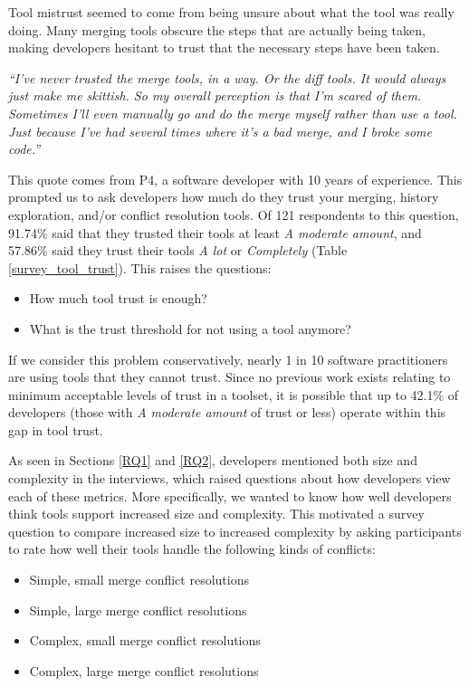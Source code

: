 Tool mistrust seemed to come from being unsure about what the tool was really doing. Many merging tools obscure the steps that are actually being taken, making developers hesitant to trust that the necessary steps have been taken. 
\begin{displayquote}
\textit{``I've never trusted the merge tools, in a way. Or the diff tools. It would always just make me skittish. So my overall perception is that I'm scared of them. Sometimes I'll even manually go and do the merge myself rather than use a tool. Just because I've had several times where it's a bad merge, and I broke some code.''}
\end{displayquote}
This quote comes from P4, a software developer with 10 years of experience.
This prompted us to ask developers how much do they trust your merging, history exploration, and/or conflict resolution tools. Of 121 respondents to this question, 91.74\% said that they trusted their tools at least \textit{A moderate amount}, and 57.86\% said they trust their tools \textit{A lot} or \textit{Completely} (Table \ref{survey_tool_trust}). This raises the questions: 
\begin{itemize}
\item How much tool trust is enough? 
\item What is the trust threshold for not using a tool anymore?
\end{itemize}
If we consider this problem conservatively, nearly 1 in 10 software practitioners are using tools that they cannot trust. Since no previous work exists relating to minimum acceptable levels of trust in a toolset, it is possible that up to 42.1\% of developers (those with \textit{A moderate amount} of trust or less) operate within this gap in tool trust.

As seen in Sections \ref{RQ1} and \ref{RQ2}, developers mentioned both size and complexity in the interviews, which raised questions about how developers view each of these metrics. More specifically, we wanted to know how well developers think tools support increased size and complexity.  
This motivated a survey question to compare increased size to increased complexity by asking participants to rate how well their tools handle the following kinds of conflicts:

\begin{itemize}
	\item Simple, small merge conflict resolutions
	\item Simple, large merge conflict resolutions 
	\item Complex, small merge conflict resolutions
	\item Complex, large merge conflict resolutions
\end{itemize}

